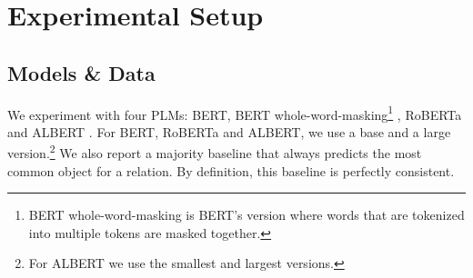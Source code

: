 \section{Experimental Setup}
\label{sec:setup}

\subsection{Models \& Data}
\label{setupdata}
We experiment with four PLMs:
BERT, BERT whole-word-masking\footnote{BERT whole-word-masking is BERT's version where words that are tokenized into multiple tokens are masked together.}
\cite{bert}, RoBERTa \cite{roberta} and ALBERT
\cite{albert}. For BERT, RoBERTa and ALBERT, we use a base and a large version.\footnote{For ALBERT we use the smallest and largest versions.}
We also report a majority baseline that always predicts the most common object for a relation. By definition, this baseline is perfectly consistent.




